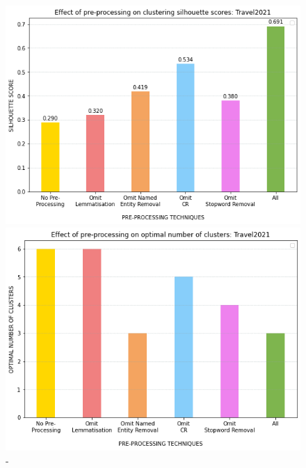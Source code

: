 \begin{figure}[H]
\centering
  \begin{minipage}[t]{.40\linewidth}
    \centering
    \includegraphics[width=\linewidth]{images/eval/effect_preprocessing.png}
    \caption{-}
    \label{fig:pre-processing_sil}
  \end{minipage}
  \begin{minipage}[t]{.40\textwidth}
    \centering
    \includegraphics[width=\linewidth]{images/eval/preprocessing_cluster_no.png}
    \caption{-}
     \label{fig:pre-processing_cluster_no}
  \end{minipage}
\end{figure}

